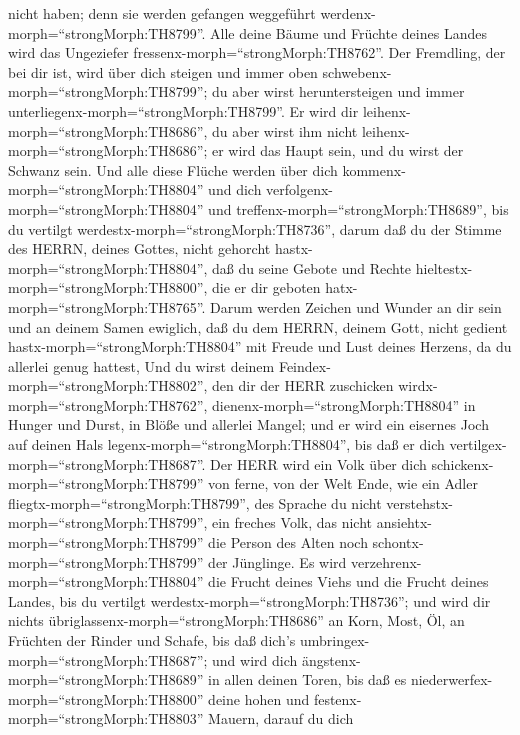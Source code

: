 nicht haben; denn sie werden gefangen weggeführt
werdenx-morph=``strongMorph:TH8799''.  Alle deine Bäume und
Früchte deines Landes wird das Ungeziefer
fressenx-morph=``strongMorph:TH8762''.  Der Fremdling, der
bei dir ist, wird über dich steigen und immer oben
schwebenx-morph=``strongMorph:TH8799''; du aber wirst heruntersteigen
und immer unterliegenx-morph=``strongMorph:TH8799''.  Er
wird dir leihenx-morph=``strongMorph:TH8686'', du aber wirst ihm nicht
leihenx-morph=``strongMorph:TH8686''; er wird das Haupt sein, und du
wirst der Schwanz sein.  Und alle diese Flüche werden über
dich kommenx-morph=``strongMorph:TH8804'' und dich
verfolgenx-morph=``strongMorph:TH8804'' und
treffenx-morph=``strongMorph:TH8689'', bis du vertilgt
werdestx-morph=``strongMorph:TH8736'', darum daß du der Stimme des
HERRN, deines Gottes, nicht gehorcht hastx-morph=``strongMorph:TH8804'',
daß du seine Gebote und Rechte hieltestx-morph=``strongMorph:TH8800'',
die er dir geboten hatx-morph=``strongMorph:TH8765''. 
Darum werden Zeichen und Wunder an dir sein und an deinem Samen
ewiglich,  daß du dem HERRN, deinem Gott, nicht gedient
hastx-morph=``strongMorph:TH8804'' mit Freude und Lust deines Herzens,
da du allerlei genug hattest,  Und du wirst deinem
Feindex-morph=``strongMorph:TH8802'', den dir der HERR zuschicken
wirdx-morph=``strongMorph:TH8762'', dienenx-morph=``strongMorph:TH8804''
in Hunger und Durst, in Blöße und allerlei Mangel; und er wird ein
eisernes Joch auf deinen Hals legenx-morph=``strongMorph:TH8804'', bis
daß er dich vertilgex-morph=``strongMorph:TH8687''.  Der
HERR wird ein Volk über dich schickenx-morph=``strongMorph:TH8799'' von
ferne, von der Welt Ende, wie ein Adler
fliegtx-morph=``strongMorph:TH8799'', des Sprache du nicht
verstehstx-morph=``strongMorph:TH8799'',  ein freches Volk,
das nicht ansiehtx-morph=``strongMorph:TH8799'' die Person des Alten
noch schontx-morph=``strongMorph:TH8799'' der Jünglinge. 
Es wird verzehrenx-morph=``strongMorph:TH8804'' die Frucht deines Viehs
und die Frucht deines Landes, bis du vertilgt
werdestx-morph=``strongMorph:TH8736''; und wird dir nichts
übriglassenx-morph=``strongMorph:TH8686'' an Korn, Most, Öl, an Früchten
der Rinder und Schafe, bis daß dich's
umbringex-morph=``strongMorph:TH8687'';  und wird dich
ängstenx-morph=``strongMorph:TH8689'' in allen deinen Toren, bis daß es
niederwerfex-morph=``strongMorph:TH8800'' deine hohen und
festenx-morph=``strongMorph:TH8803'' Mauern, darauf du dich
